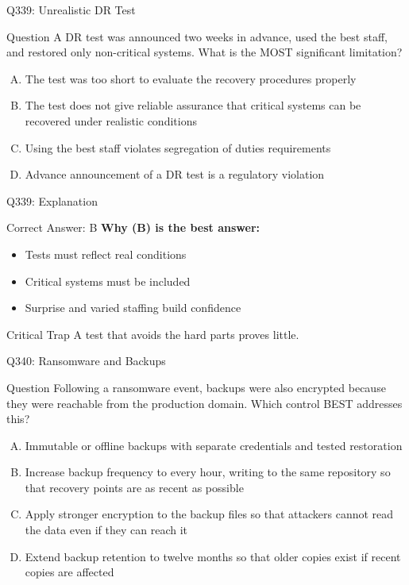 \documentclass{beamer}
\begin{document}
	\begin{frame}{Q339: Unrealistic DR Test}
		\begin{block}{Question}
			\small A DR test was announced two weeks in advance, used the best staff, and restored only non-critical systems. What is the MOST significant limitation?
		\end{block}
		\begin{enumerate}[(A)]
			\footnotesize
			\item The test was too short to evaluate the recovery procedures properly
			\item The test does not give reliable assurance that critical systems can be recovered under realistic conditions
			\item Using the best staff violates segregation of duties requirements
			\item Advance announcement of a DR test is a regulatory violation
		\end{enumerate}
	\end{frame}
	
	\begin{frame}{Q339: Explanation}
		\begin{block}{Correct Answer: B}
			\textbf{Why (B) is the best answer:}
			\begin{itemize}
				\item Tests must reflect real conditions
				\item Critical systems must be included
				\item Surprise and varied staffing build confidence
			\end{itemize}
		\end{block}
		\begin{alertblock}{Critical Trap}
			A test that avoids the hard parts proves little.
		\end{alertblock}
	\end{frame}
	
	\begin{frame}{Q340: Ransomware and Backups}
		\begin{block}{Question}
			\small Following a ransomware event, backups were also encrypted because they were reachable from the production domain. Which control BEST addresses this?
		\end{block}
		\begin{enumerate}[(A)]
			\footnotesize
			\item Immutable or offline backups with separate credentials and tested restoration
			\item Increase backup frequency to every hour, writing to the same repository so that recovery points are as recent as possible
			\item Apply stronger encryption to the backup files so that attackers cannot read the data even if they can reach it
			\item Extend backup retention to twelve months so that older copies exist if recent copies are affected
		\end{enumerate}
	\end{frame}
	
\end{document}
